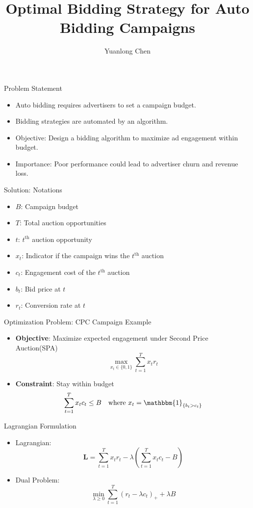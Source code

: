 \documentclass{beamer}
\title{Optimal Bidding Strategy for Auto Bidding Campaigns}
\author{Yuanlong Chen}
\date{}
\begin{document}
	
	\frame{\titlepage}
	
	\begin{frame}{Problem Statement}
		\begin{itemize}
			\item Auto bidding requires advertisers to set a campaign budget.
			\item Bidding strategies are automated by an algorithm.
			\item Objective: Design a bidding algorithm to maximize ad engagement within budget.
			\item Importance: Poor performance could lead to advertiser churn and revenue loss.
		\end{itemize}
	\end{frame}
	
	\begin{frame}{Solution: Notations}
		\begin{itemize}
			\item $B$: Campaign budget
			\item $T$: Total auction opportunities
			\item $t$: $t^{\text{th}}$ auction opportunity
			\item $x_t$: Indicator if the campaign wins the $t^{\text{th}}$ auction
			\item $c_t$: Engagement cost of the $t^{\text{th}}$ auction
			\item $b_t$: Bid price at $t$
			\item $r_t$: Conversion rate at $t$
		\end{itemize}
	\end{frame}
	
	\begin{frame}{Optimization Problem: CPC Campaign Example}
		\begin{itemize}
			\item \textbf{Objective}: Maximize expected engagement under Second Price Auction(SPA)
			\[
			\max_{x_t \in  \{0, 1 \}}  \sum_{t=1}^T x_t r_t 
			\]
			\item \textbf{Constraint}: Stay within budget
			\[
			\sum_{t=1}^T x_t c_t \leq B \quad \text{where } x_t = \mathbbm{1}_{ \{b_t > c_t\} }
			\]
		\end{itemize}
	\end{frame}
	
	\begin{frame}{Lagrangian Formulation}
		\begin{itemize}
			\item Lagrangian:
			\[
			\mathbf{L} = \sum_{t=1}^T x_t r_t - \lambda \left( \sum_{t=1}^T x_t c_t - B \right)
			\]
			\item Dual Problem:
			\[
			\min_{\lambda \geq 0} \sum_{t=1}^T \left( r_t  - \lambda c_t \right)_{+} + \lambda B
			\]
		\end{itemize}
	\end{frame}
	
\end{document}
